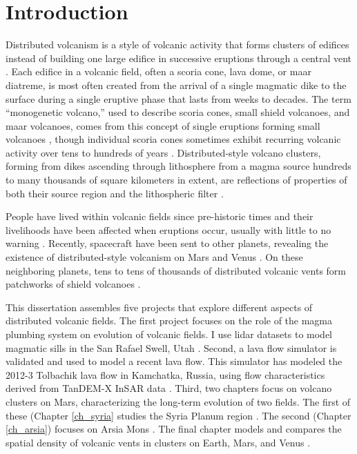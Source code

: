 \chapter[Introduction]{Introduction}

Distributed volcanism is a style of volcanic activity that forms clusters of edifices instead of building one large edifice in successive eruptions through a central vent \citep{valentine2000basaltic}. Each edifice in a volcanic field, often a scoria cone, lava dome, or maar diatreme, is most often created from the arrival of a single magmatic dike to the surface during a single eruptive phase that lasts from weeks to decades. The term ``monogenetic volcano,'' used to describe scoria cones, small shield volcanoes, and maar volcanoes, comes from this concept of single eruptions forming small volcanoes \citep{greeley1977basaltic}, though individual scoria cones sometimes exhibit recurring volcanic activity over tens to hundreds of years \citep{hill1998cerro}. Distributed-style volcano clusters, forming from dikes ascending through lithosphere from a magma source hundreds to many thousands of square kilometers in extent, are reflections of properties of both their source region and the lithospheric filter \citep{settle1979structure}.

People have lived within volcanic fields since pre-historic times and their livelihoods have been affected when eruptions occur, usually with little to no warning \citep{elson2007living}. Recently, spacecraft have been sent to other planets, revealing the existence of distributed-style volcanism on Mars \citep{carr1977some} and Venus \citep{head1992venus}. On these neighboring planets, tens to tens of thousands of distributed volcanic vents form patchworks of shield volcanoes \citep{richardson2013volcanic,miller2012shield}. 

This dissertation assembles five projects that explore different aspects of distributed volcanic fields. The first project focuses on the role of the magma plumbing system on evolution of volcanic fields. I use lidar datasets to model magmatic sills in the San Rafael Swell, Utah \citep{richardson2015sills}. Second, a lava flow simulator is validated and used to model a recent lava flow. This simulator has modeled the 2012-3 Tolbachik lava flow in Kamchatka, Russia, using flow characteristics derived from TanDEM-X InSAR data \citep{kubanek2015lava}. Third, two chapters focus on volcano clusters on Mars, characterizing the long-term evolution of two fields. The first of these (Chapter \ref{ch_syria} studies the Syria Planum region \citep{richardson2013volcanic}. The second (Chapter \ref{ch_arsia}) focuses on Arsia Mons \citep{richardson2015recurrence}. The final chapter models and compares the spatial density of volcanic vents in clusters on Earth, Mars, and Venus \citep{richardson2012comparison}.

